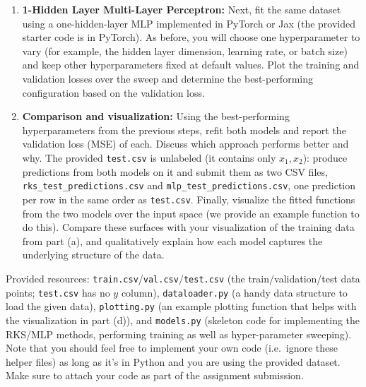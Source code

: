 \documentclass{article}
\newcounter{exercise}[section]
\newcounter{example}[section]
\newcounter{code}[section]
\begin{document}
\begin{exercise}[]
\begin{enumerate}[label=(\alph*)]
    \item \textbf{1-Hidden Layer Multi-Layer Perceptron:} Next, fit the same dataset using a one-hidden-layer MLP implemented in PyTorch or Jax (the provided starter code is in PyTorch). As before, you will choose one hyperparameter to vary (for example, the hidden layer dimension, learning rate, or batch size) and keep other hyperparameters fixed at default values. Plot the training and validation losses over the sweep and determine the best-performing configuration based on the validation loss.
    \item \textbf{Comparison and visualization:} Using the best-performing hyperparameters from the previous steps, refit both models and report the validation loss (MSE) of each. Discuss which approach performs better and why. The provided \texttt{test.csv} is unlabeled (it contains only $x_1,x_2$): produce predictions from both models on it and submit them as two CSV files, \texttt{rks\_test\_predictions.csv} and \texttt{mlp\_test\_predictions.csv}, one prediction per row in the same order as \texttt{test.csv}. Finally, visualize the fitted functions from the two models over the input space (we provide an example function to do this). Compare these surfaces with your visualization of the training data from part (a), and qualitatively explain how each model captures the underlying structure of the data.
  \end{enumerate}
  Provided resources: \texttt{train.csv}/\texttt{val.csv}/\texttt{test.csv} (the train/validation/test data points; \texttt{test.csv} has no $y$ column), \texttt{dataloader.py} (a handy data structure to load the given data), \texttt{plotting.py} (an example plotting function that helps with the visualization in part (d)), and \texttt{models.py} (skeleton code for implementing the RKS/MLP methods, performing training as well as hyper-parameter sweeping). Note that you should feel free to implement your own code (i.e.\ ignore these helper files) as long as it's in Python and you are using the provided dataset. Make sure to attach your code as part of the assignment submission.
\end{exercise}
\end{document}
